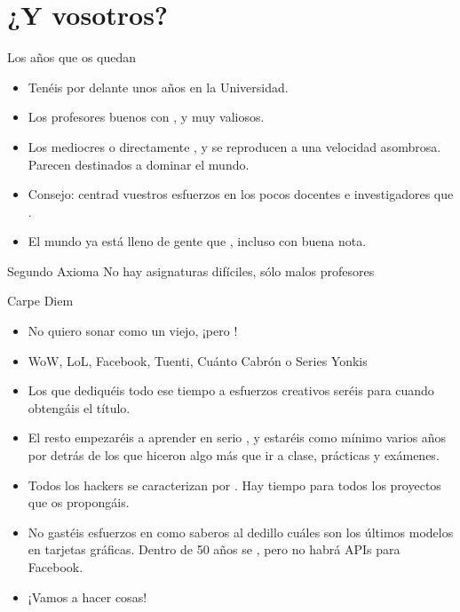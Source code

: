 \documentclass[14pt]{beamer}
\begin{document}
\section{¿Y vosotros?}
\begin{frame}{Los años que os quedan}
  \begin{itemize}
    \item Tenéis por delante unos años  en la
      Universidad.
    \item Los profesores buenos con , y muy valiosos.
    \item Los mediocres o directamente , y
      se reproducen a una velocidad asombrosa. Parecen destinados a
      dominar el mundo.
    \item Consejo: centrad vuestros esfuerzos en los pocos docentes e
      investigadores que .
    \item El mundo ya está lleno de gente que , incluso con buena nota.
  \end{itemize}

  \begin{alertblock}{\centering Segundo Axioma}
    \centering No hay asignaturas difíciles, sólo malos profesores
  \end{alertblock}
\end{frame}

\begin{frame}{Carpe Diem}
  \begin{itemize}
    \item No quiero sonar como un viejo, ¡pero !
    \item WoW, LoL, Facebook, Tuenti, Cuánto Cabrón o Series Yonkis
    \item Los que dediquéis todo ese tiempo a esfuerzos creativos
      seréis  para
      cuando obtengáis el título.
    \item El resto empezaréis a aprender en serio , y estaréis como mínimo varios años por detrás de los
      que hiceron algo más que ir a clase, prácticas y exámenes.
    \item Todos los hackers se caracterizan por . Hay tiempo para todos los proyectos que os
      propongáis.
    \item No gastéis esfuerzos en 
      como saberos al dedillo cuáles son los últimos modelos en
      tarjetas gráficas. Dentro de 50 años se , pero no habrá APIs para Facebook.
    \item ¡Vamos a hacer cosas!
  \end{itemize}
\end{frame}
\end{document}
